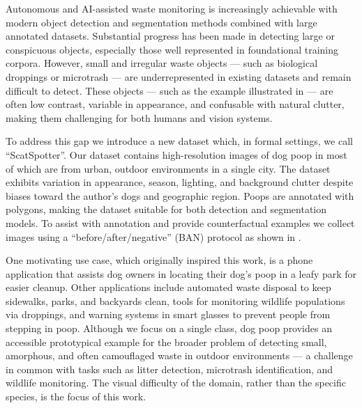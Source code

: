 Autonomous and AI-assisted waste monitoring is increasingly achievable with modern object detection and
segmentation methods \cite{sandler_mobilenetv2_2018,
  siam_rtseg_2018,yu_mobilenet_yolo_2023,liu_grounding_2024} combined with large annotated datasets.
Substantial progress has been made in detecting large or conspicuous objects, especially those well represented in foundational training corpora. 
However, small and irregular waste objects --- such as biological droppings or microtrash --- 
are underrepresented in existing datasets and remain difficult to detect.
These objects --- such as the example illustrated in   ---
are often low contrast, variable in appearance, and confusable with
natural clutter, making them challenging for both humans and vision systems.

To address this gap we introduce a new dataset which, in formal settings, we call ``ScatSpotter''.
Our dataset contains high-resolution images of dog poop in most of which are
from urban, outdoor environments in a single city.
The dataset exhibits variation in appearance, season, lighting, and background clutter despite
  biases toward the author's dogs and geographic region.
Poops are annotated with polygons, making the dataset suitable for both detection and segmentation models.
To assist with annotation and provide counterfactual examples we collect images using a
  ``before/after/negative'' (BAN) protocol as shown in .


One motivating use case, which originally inspired this work, is a phone application that assists dog owners
  in locating their dog's poop in a leafy park for easier cleanup.
Other applications include automated waste disposal to keep sidewalks, parks, and backyards clean, tools for monitoring
  wildlife populations via droppings, and warning systems in smart glasses to prevent people from stepping in
  poop.
Although we focus on a single class, dog poop provides an accessible prototypical example for the
  broader problem of detecting small, amorphous, and often camouflaged waste in outdoor environments --- a
  challenge in common with tasks such as litter detection, microtrash identification, and wildlife monitoring.
The visual difficulty of the domain, rather than the specific species, is the focus of this work.

